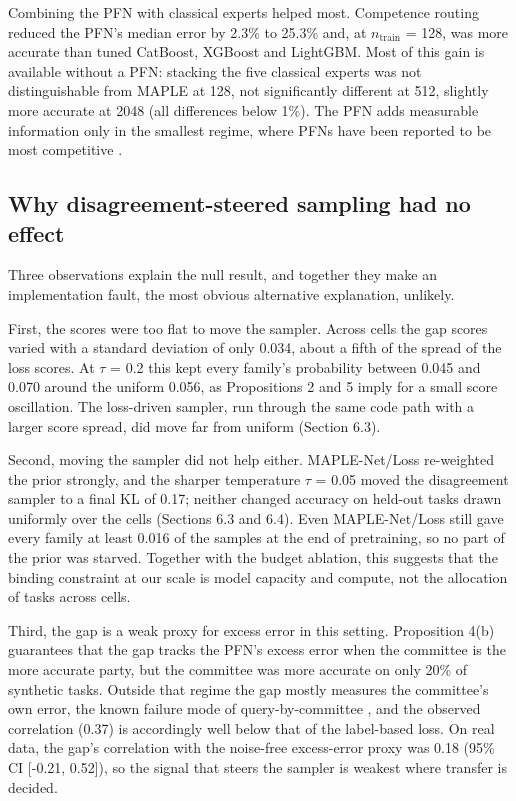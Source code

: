 \documentclass[mathematics,article,submit,pdftex,moreauthors]{Definitions/mdpi}
\begin{document}
Combining the PFN with classical experts helped most. Competence routing reduced the PFN's median error by 2.3\% to 25.3\% and, at $n_{\mathrm{train}}$ = 128, was more accurate than tuned CatBoost, XGBoost and LightGBM. Most of this gain is available without a PFN: stacking the five classical experts was not distinguishable from MAPLE at 128, not significantly different at 512, slightly more accurate at 2048 (all differences below 1\%). The PFN adds measurable information only in the smallest regime, where PFNs have been reported to be most competitive \cite{hollmann2023tabpfn,mcelfresh2023when}.

\subsection{Why disagreement-steered sampling had no effect}

Three observations explain the null result, and together they make an implementation fault, the most obvious alternative explanation, unlikely.

First, the scores were too flat to move the sampler. Across cells the gap scores varied with a standard deviation of only 0.034, about a fifth of the spread of the loss scores. At $\tau$ = 0.2 this kept every family's probability between 0.045 and 0.070 around the uniform 0.056, as Propositions 2 and 5 imply for a small score oscillation. The loss-driven sampler, run through the same code path with a larger score spread, did move far from uniform (Section 6.3).

Second, moving the sampler did not help either. MAPLE-Net/Loss re-weighted the prior strongly, and the sharper temperature $\tau$ = 0.05 moved the disagreement sampler to a final KL of 0.17; neither changed accuracy on held-out tasks drawn uniformly over the cells (Sections 6.3 and 6.4). Even MAPLE-Net/Loss still gave every family at least 0.016 of the samples at the end of pretraining, so no part of the prior was starved. Together with the budget ablation, this suggests that the binding constraint at our scale is model capacity and compute, not the allocation of tasks across cells.

Third, the gap is a weak proxy for excess error in this setting. Proposition 4(b) guarantees that the gap tracks the PFN's excess error when the committee is the more accurate party, but the committee was more accurate on only 20\% of synthetic tasks. Outside that regime the gap mostly measures the committee's own error, the known failure mode of query-by-committee \cite{burbidge2007active}, and the observed correlation (0.37) is accordingly well below that of the label-based loss. On real data, the gap's correlation with the noise-free excess-error proxy was 0.18 (95\% CI [-0.21, 0.52]), so the signal that steers the sampler is weakest where transfer is decided.
\end{document}
